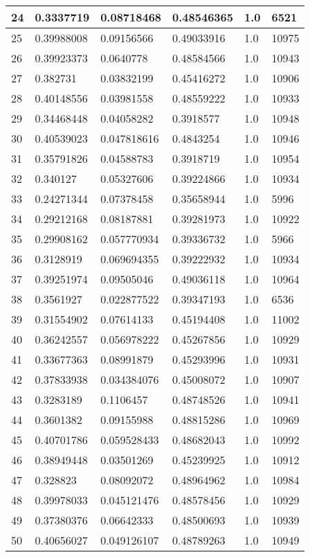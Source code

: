 \begin{longtable}{|l|l|l|l|l|l|}
24 & 0.3337719 & 0.08718468 & 0.48546365 & 1.0 & 6521 \\ \hline 
25 & 0.39988008 & 0.09156566 & 0.49033916 & 1.0 & 10975 \\ \hline 
26 & 0.39923373 & 0.0640778 & 0.48584566 & 1.0 & 10943 \\ \hline 
27 & 0.382731 & 0.03832199 & 0.45416272 & 1.0 & 10906 \\ \hline 
28 & 0.40148556 & 0.03981558 & 0.48559222 & 1.0 & 10933 \\ \hline 
29 & 0.34468448 & 0.04058282 & 0.3918577 & 1.0 & 10948 \\ \hline 
30 & 0.40539023 & 0.047818616 & 0.4843254 & 1.0 & 10946 \\ \hline 
31 & 0.35791826 & 0.04588783 & 0.3918719 & 1.0 & 10954 \\ \hline 
32 & 0.340127 & 0.05327606 & 0.39224866 & 1.0 & 10934 \\ \hline 
33 & 0.24271344 & 0.07378458 & 0.35658944 & 1.0 & 5996 \\ \hline 
34 & 0.29212168 & 0.08187881 & 0.39281973 & 1.0 & 10922 \\ \hline 
35 & 0.29908162 & 0.057770934 & 0.39336732 & 1.0 & 5966 \\ \hline 
36 & 0.3128919 & 0.069694355 & 0.39222932 & 1.0 & 10934 \\ \hline 
37 & 0.39251974 & 0.09505046 & 0.49036118 & 1.0 & 10964 \\ \hline 
38 & 0.3561927 & 0.022877522 & 0.39347193 & 1.0 & 6536 \\ \hline 
39 & 0.31554902 & 0.07614133 & 0.45194408 & 1.0 & 11002 \\ \hline 
40 & 0.36242557 & 0.056978222 & 0.45267856 & 1.0 & 10929 \\ \hline 
41 & 0.33677363 & 0.08991879 & 0.45293996 & 1.0 & 10931 \\ \hline 
42 & 0.37833938 & 0.034384076 & 0.45008072 & 1.0 & 10907 \\ \hline 
43 & 0.3283189 & 0.1106457 & 0.48748526 & 1.0 & 10941 \\ \hline 
44 & 0.3601382 & 0.09155988 & 0.48815286 & 1.0 & 10969 \\ \hline 
45 & 0.40701786 & 0.059528433 & 0.48682043 & 1.0 & 10992 \\ \hline 
46 & 0.38949448 & 0.03501269 & 0.45239925 & 1.0 & 10912 \\ \hline 
47 & 0.328823 & 0.08092072 & 0.48964962 & 1.0 & 10984 \\ \hline 
48 & 0.39978033 & 0.045121476 & 0.48578456 & 1.0 & 10929 \\ \hline 
49 & 0.37380376 & 0.06642333 & 0.48500693 & 1.0 & 10939 \\ \hline 
50 & 0.40656027 & 0.049126107 & 0.48789263 & 1.0 & 10949 \\ \hline 
\end{longtable}